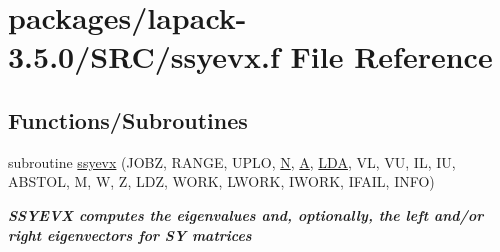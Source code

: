\hypertarget{ssyevx_8f}{}\section{packages/lapack-\/3.5.0/\+S\+R\+C/ssyevx.f File Reference}
\label{ssyevx_8f}
\subsection*{Functions/\+Subroutines}
\begin{DoxyCompactItemize}
\item 
subroutine \hyperlink{group__realSYeigen_ga7f8f413f03a84dbe4ac7a973024d0a48}{ssyevx} (J\+O\+B\+Z, R\+A\+N\+G\+E, U\+P\+L\+O, \hyperlink{polmisc_8c_a0240ac851181b84ac374872dc5434ee4}{N}, \hyperlink{classA}{A}, \hyperlink{example__user_8c_ae946da542ce0db94dced19b2ecefd1aa}{L\+D\+A}, V\+L, V\+U, I\+L, I\+U, A\+B\+S\+T\+O\+L, M, W, Z, L\+D\+Z, W\+O\+R\+K, L\+W\+O\+R\+K, I\+W\+O\+R\+K, I\+F\+A\+I\+L, I\+N\+F\+O)
\begin{DoxyCompactList}\small\item\em {\bfseries  S\+S\+Y\+E\+V\+X computes the eigenvalues and, optionally, the left and/or right eigenvectors for S\+Y matrices} \end{DoxyCompactList}\end{DoxyCompactItemize}
